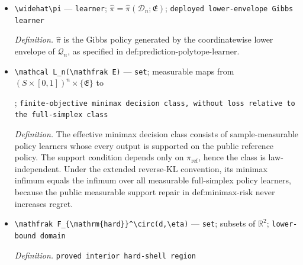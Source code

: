 \documentclass{article}
\begin{document}
\begin{itemize}
  \par\smallskip\noindent\emph{Definition.} Diagnostic empirical pessimistic welfare criterion evaluated only on reference-supported policies; it does not define \(\widehat\pi\). Every Gibbs learner constructed in the note is automatically reference supported.
  \item \texttt{\textbackslash{}\allowbreak{}widehat\textbackslash{}\allowbreak{}pi} --- \texttt{learner}; \(\widehat\pi=\widehat\pi(\mathcal D_n;\mathfrak E)\); \texttt{deployed lower-\allowbreak{}envelope Gibbs learner}
  \par\smallskip\noindent\emph{Definition.} \(\widehat\pi\) is the Gibbs policy generated by the coordinatewise lower envelope of \(\mathcal Q_n\), as specified in \(\text{def:prediction-polytope-learner}\).
  \item \texttt{\textbackslash{}\allowbreak{}mathcal L\_\allowbreak{}n(\textbackslash{}\allowbreak{}mathfrak E)} --- \texttt{set}; measurable maps from \((S\times[0,1])^n\times\{\mathfrak E\}\) to \par\noindent {}\par\noindent; \texttt{finite-\allowbreak{}objective minimax decision class,\allowbreak{} without loss relative to the full-\allowbreak{}simplex class}
  \par\smallskip\noindent\emph{Definition.} The effective minimax decision class consists of sample-measurable policy learners whose every output is supported on the public reference policy. The support condition depends only on \(\pi_{\mathrm{ref}}\), hence the class is law-independent. Under the extended reverse-KL convention, its minimax infimum equals the infimum over all measurable full-simplex policy learners, because the public measurable support repair in \(\text{def:minimax-risk}\) never increases regret.
  \item \texttt{\textbackslash{}\allowbreak{}mathfrak F\_\allowbreak{}\{\textbackslash{}\allowbreak{}mathrm\{hard\}\allowbreak{}\}\allowbreak{}\textasciicircum{}\textbackslash{}\allowbreak{}circ(d,\allowbreak{}\textbackslash{}\allowbreak{}eta)} --- \texttt{set}; subsets of \(\mathbb R^2\); \texttt{lower-\allowbreak{}bound domain}
  \par\smallskip\noindent\emph{Definition.} \texttt{proved interior hard-\allowbreak{}shell region}

\end{itemize}
\end{document}
